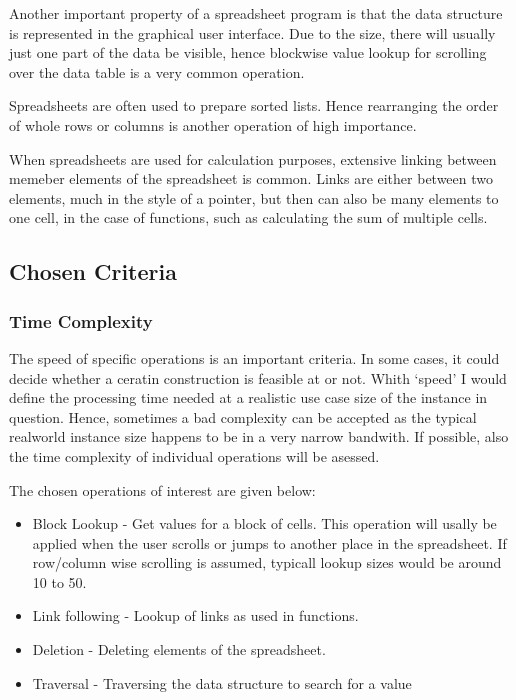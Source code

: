 \documentclass[a4paper,11pt,twoside]{article}
\begin{document}
Another important property of a spreadsheet program is that the data
structure is represented in the graphical user interface. Due to the
size, there will usually just one part of the data be visible, hence
blockwise value lookup for scrolling over the data table is a very
common operation.

Spreadsheets are often used to prepare sorted lists. Hence
rearranging the order of whole rows or columns is another operation of
high importance.

When spreadsheets are used for calculation purposes, extensive linking
between memeber elements of the spreadsheet is common. Links are
either between two elements, much in the style of a pointer, but then
can also be many elements to one cell, in the case of functions, such
as calculating the sum of multiple cells.


\subsection{Chosen Criteria}
\subsubsection{Time Complexity}
The speed of specific operations is an important criteria. In some
cases, it could decide whether a ceratin construction is feasible at
or not. Whith `speed' I would define the processing time needed at a
realistic use case size of the instance in question. Hence, sometimes
a bad complexity can be accepted as the typical realworld instance
size happens to be in a very narrow bandwith.
If possible, also the time complexity of individual operations will be
asessed.    

The chosen operations of interest are given below:

\begin{itemize}
\item Block Lookup - Get values for a block of cells. This operation
  will usally be applied when the user scrolls or jumps to another
  place in the spreadsheet. If row/column wise scrolling is assumed,
  typicall lookup sizes would be around 10 to 50. 
\item Link following - Lookup of links as used in functions. 
\item Deletion - Deleting elements of the spreadsheet.
\item Traversal - Traversing the data structure to search for a value
\end{itemize}
\end{document}
